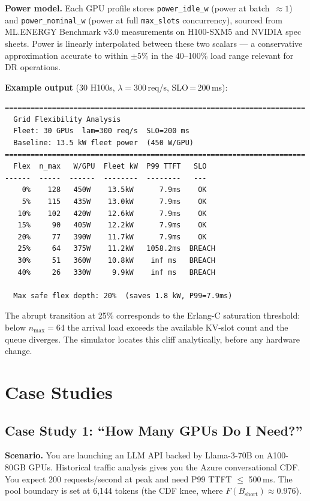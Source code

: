 \documentclass[11pt,a4paper]{article}
\newcommand{\Bshort}{B_{\text{short}}}
\begin{document}
\textbf{Power model.}
Each GPU profile stores \texttt{power\_idle\_w} (power at batch~$\approx 1$)
and \texttt{power\_nominal\_w} (power at full \texttt{max\_slots} concurrency),
sourced from ML.ENERGY Benchmark v3.0 measurements on H100-SXM5
and NVIDIA spec sheets.  Power is linearly interpolated between these two
scalars --- a conservative approximation accurate to within $\pm 5\%$ in the
40--100\% load range relevant for DR operations.

\textbf{Example output} (30 H100s, $\lambda = 300$\,req/s, SLO\,=\,200\,ms):

\begin{lstlisting}[style=output]
======================================================================
  Grid Flexibility Analysis
  Fleet: 30 GPUs  lam=300 req/s  SLO=200 ms
  Baseline: 13.5 kW fleet power  (450 W/GPU)
======================================================================
  Flex  n_max   W/GPU  Fleet kW  P99 TTFT   SLO
------  -----  ------  --------  --------   ---
    0%    128   450W    13.5kW      7.9ms    OK
    5%    115   435W    13.0kW      7.9ms    OK
   10%    102   420W    12.6kW      7.9ms    OK
   15%     90   405W    12.2kW      7.9ms    OK
   20%     77   390W    11.7kW      7.9ms    OK
   25%     64   375W    11.2kW   1058.2ms  BREACH
   30%     51   360W    10.8kW    inf ms   BREACH
   40%     26   330W     9.9kW    inf ms   BREACH

  Max safe flex depth: 20%  (saves 1.8 kW, P99=7.9ms)
\end{lstlisting}

The abrupt transition at 25\% corresponds to the Erlang-C saturation
threshold: below $n_{\max} = 64$ the arrival load exceeds the available
KV-slot count and the queue diverges.  The simulator locates this cliff
analytically, before any hardware change.

\section{Case Studies}
\label{sec:casestudies}

\subsection{Case Study 1: ``How Many GPUs Do I Need?''}
\label{sec:cs-optimize}

\textbf{Scenario.}  You are launching an LLM API backed by Llama-3-70B
on A100-80GB GPUs.  Historical traffic analysis gives you the Azure
conversational CDF.  You expect 200 requests/second at peak and
need P99 TTFT $\leq$ 500\,ms.  The pool boundary is set at 6,144 tokens
(the CDF knee, where $F(\Bshort) \approx 0.976$).
\end{document}
